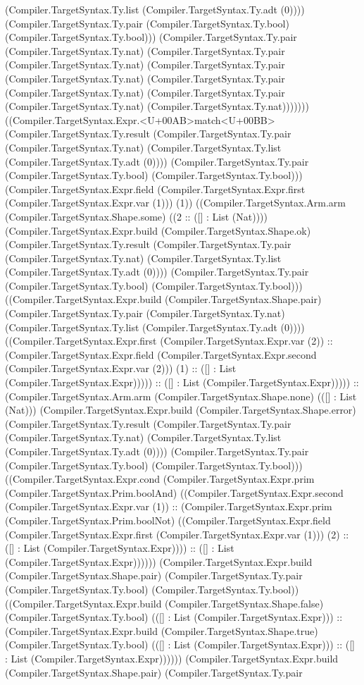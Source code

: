 \documentclass[11pt]{article}
\begin{document}
(Compiler.TargetSyntax.Ty.list (Compiler.TargetSyntax.Ty.adt (0)))) (Compiler.TargetSyntax.Ty.pair (Compiler.TargetSyntax.Ty.bool) (Compiler.TargetSyntax.Ty.bool))) (Compiler.TargetSyntax.Ty.pair (Compiler.TargetSyntax.Ty.nat) (Compiler.TargetSyntax.Ty.pair (Compiler.TargetSyntax.Ty.nat) (Compiler.TargetSyntax.Ty.pair (Compiler.TargetSyntax.Ty.nat) (Compiler.TargetSyntax.Ty.pair (Compiler.TargetSyntax.Ty.nat) (Compiler.TargetSyntax.Ty.pair (Compiler.TargetSyntax.Ty.nat) (Compiler.TargetSyntax.Ty.nat))))))) ((Compiler.TargetSyntax.Expr.<U+00AB>match<U+00BB> (Compiler.TargetSyntax.Ty.result (Compiler.TargetSyntax.Ty.pair (Compiler.TargetSyntax.Ty.nat) (Compiler.TargetSyntax.Ty.list (Compiler.TargetSyntax.Ty.adt (0)))) (Compiler.TargetSyntax.Ty.pair (Compiler.TargetSyntax.Ty.bool) (Compiler.TargetSyntax.Ty.bool))) (Compiler.TargetSyntax.Expr.field (Compiler.TargetSyntax.Expr.first (Compiler.TargetSyntax.Expr.var (1))) (1)) ((Compiler.TargetSyntax.Arm.arm (Compiler.TargetSyntax.Shape.some) ((2 :: ([] : List (Nat)))) (Compiler.TargetSyntax.Expr.build (Compiler.TargetSyntax.Shape.ok) (Compiler.TargetSyntax.Ty.result (Compiler.TargetSyntax.Ty.pair (Compiler.TargetSyntax.Ty.nat) (Compiler.TargetSyntax.Ty.list (Compiler.TargetSyntax.Ty.adt (0)))) (Compiler.TargetSyntax.Ty.pair (Compiler.TargetSyntax.Ty.bool) (Compiler.TargetSyntax.Ty.bool))) ((Compiler.TargetSyntax.Expr.build (Compiler.TargetSyntax.Shape.pair) (Compiler.TargetSyntax.Ty.pair (Compiler.TargetSyntax.Ty.nat) (Compiler.TargetSyntax.Ty.list (Compiler.TargetSyntax.Ty.adt (0)))) ((Compiler.TargetSyntax.Expr.first (Compiler.TargetSyntax.Expr.var (2)) :: (Compiler.TargetSyntax.Expr.field (Compiler.TargetSyntax.Expr.second (Compiler.TargetSyntax.Expr.var (2))) (1) :: ([] : List (Compiler.TargetSyntax.Expr))))) :: ([] : List (Compiler.TargetSyntax.Expr))))) :: (Compiler.TargetSyntax.Arm.arm (Compiler.TargetSyntax.Shape.none) (([] : List (Nat))) (Compiler.TargetSyntax.Expr.build (Compiler.TargetSyntax.Shape.error) (Compiler.TargetSyntax.Ty.result (Compiler.TargetSyntax.Ty.pair (Compiler.TargetSyntax.Ty.nat) (Compiler.TargetSyntax.Ty.list (Compiler.TargetSyntax.Ty.adt (0)))) (Compiler.TargetSyntax.Ty.pair (Compiler.TargetSyntax.Ty.bool) (Compiler.TargetSyntax.Ty.bool))) ((Compiler.TargetSyntax.Expr.cond (Compiler.TargetSyntax.Expr.prim (Compiler.TargetSyntax.Prim.boolAnd) ((Compiler.TargetSyntax.Expr.second (Compiler.TargetSyntax.Expr.var (1)) :: (Compiler.TargetSyntax.Expr.prim (Compiler.TargetSyntax.Prim.boolNot) ((Compiler.TargetSyntax.Expr.field (Compiler.TargetSyntax.Expr.first (Compiler.TargetSyntax.Expr.var (1))) (2) :: ([] : List (Compiler.TargetSyntax.Expr)))) :: ([] : List (Compiler.TargetSyntax.Expr)))))) (Compiler.TargetSyntax.Expr.build (Compiler.TargetSyntax.Shape.pair) (Compiler.TargetSyntax.Ty.pair (Compiler.TargetSyntax.Ty.bool) (Compiler.TargetSyntax.Ty.bool)) ((Compiler.TargetSyntax.Expr.build (Compiler.TargetSyntax.Shape.false) (Compiler.TargetSyntax.Ty.bool) (([] : List (Compiler.TargetSyntax.Expr))) :: (Compiler.TargetSyntax.Expr.build (Compiler.TargetSyntax.Shape.true) (Compiler.TargetSyntax.Ty.bool) (([] : List (Compiler.TargetSyntax.Expr))) :: ([] : List (Compiler.TargetSyntax.Expr)))))) (Compiler.TargetSyntax.Expr.build (Compiler.TargetSyntax.Shape.pair) (Compiler.TargetSyntax.Ty.pair 
\end{document}
